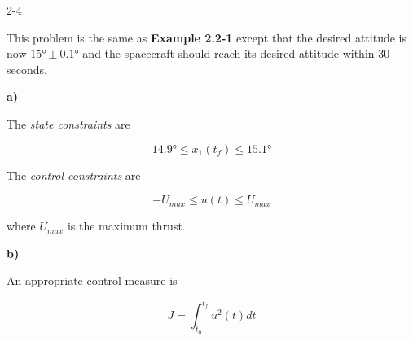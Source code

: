 \begin{problem}{2-4}
\end{problem}

This problem is the same as \textbf{Example 2.2-1} except that the desired 
attitude is now $\ang{15} \pm \ang{0.1}$ and the spacecraft should reach its 
desired attitude within $30$ seconds.

\noindent \textbf{a)}

The \textit{state constraints} are

\begin{equation}\label{eq:sc_att_15}
    \ang{14.9} \leq x_1(t_f) \leq \ang{15.1}
\end{equation}

The \textit{control constraints} are

\begin{equation}\label{eq:sc_att_15}
   -U_{max} \leq u(t) \leq U_{max}
\end{equation}

\noindent where $U_{max}$ is the maximum thrust.

\noindent \textbf{b)}

An appropriate control measure is

\begin{equation}
  J = \int_{t_0}^{t_f} u^2(t) dt
\end{equation}


